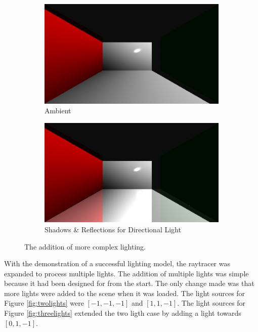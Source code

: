 \documentclass[letterpaper, 11pt, onecolumn, oneside]{article}
\begin{document}
    \begin{figure}
    \centering
    \begin{subfigure}{.5\textwidth}
      \centering
      \includegraphics[width=.85\linewidth]{box-16xAA-directional-phong-shadows.png}
      \caption{Ambient}
      \label{fig:box-shadows}
    \end{subfigure}%
    \begin{subfigure}{.5\textwidth}
      \centering
      \includegraphics[width=.85\linewidth]{box-16xAA-directional-phong-shadows-reflections.png}
      \caption{Shadows \& Reflections for Directional Light}
      \label{fig:box-reflective}
    \end{subfigure}
    \caption{The addition of more complex lighting.}
    \end{figure}

    With the demonstration of a successful lighting model, the raytracer was expanded to process multiple lights.
    The addition of multiple lights was simple because it had been designed for from the start.
    The only change made was that more lights were added to the scene when it was loaded.
    The light sources for Figure \ref{fig:twolights} were $[-1,-1,-1]$ and $[1, 1, -1]$.
    The light sources for Figure \ref{fig:threelights} extended the two ligth case by adding a light towards $[0, 1, -1]$.
\end{document}
